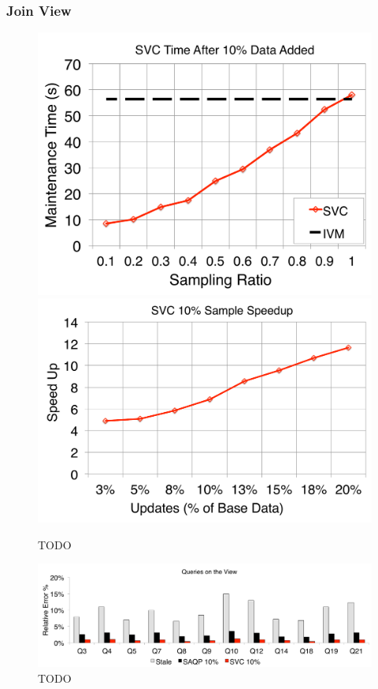 \subsubsection{Join View}

\begin{figure}[t]
\centering
\includegraphics[scale=0.15]{exp/msj_1.pdf}
\includegraphics[scale=0.15]{exp/msj_2.pdf}
 \caption{TODO \label{exp-1-samplesize}}
\end{figure}

\begin{figure}[t]
\centering
\includegraphics[scale=0.16]{exp/msj_3.pdf}
 \caption{TODO \label{exp-1-acc}}
\end{figure}

